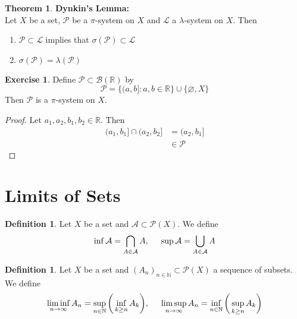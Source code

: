 \documentclass{book}
\theoremstyle{definition}
\newtheorem{defn}[definition]{Definition}
\newtheorem{thm}[definition]{Theorem}
\newtheorem{ex}[definition]{Exercise}
\newcommand{\lam}{\lambda}
\newcommand{\sig}{\sigma}
\newcommand{\N}{\mathbb{N}}
\newcommand{\R}{\mathbb{R}}
\newcommand{\MA}{\mathcal{A}}
\newcommand{\MB}{\mathcal{B}}
\newcommand{\ML}{\mathcal{L}}
\newcommand{\MP}{\mathcal{P}}
\newcommand{\ld}[1]{\label{defn:#1}}
\DeclareMathOperator*{\0}{\mbf{0}}
\DeclareMathOperator*{\1}{\mbf{1}}
\begin{document}
	\begin{thm} \textbf{Dynkin's Lemma:} \\
		Let $X$ be a set, $\MP$ be a $\pi$-system on $X$ and $\ML$ a $\lam$-system on $X$. Then
		\begin{enumerate}
			\item $\MP \subset \ML$ implies that $\sig(\MP) \subset \ML$ 
			\item $\sig(\MP) = \lam(\MP)$
		\end{enumerate} 
	\end{thm}
	
	\begin{ex}
		Define $\MP \subset \MB(\R)$ by $$\MP = \{(a,b]: a,b \in \R\} \cup \{\varnothing, X\}$$
		Then $\MP$ is a $\pi$-system on $X$.
	\end{ex}

	\begin{proof}
		Let $a_1, a_2, b_1, b_2 \in \R$. Then 
		\begin{align*}
			(a_1, b_1] \cap (a_2, b_2] 
			& = (a_2, b_1] \\
			& \in \MP
		\end{align*} 
	\end{proof}


	
		
	
	
	
	
	
	
	
	
	
	
	
	
	
	
	
	
	
	
	
	
	
	
	
	
	
	
	\newpage
	\section{Limits of Sets}
	
	\begin{defn} \ld{00000} 
		Let $X$ be a set and $\MA \subset \MP(X)$. We define $$\inf \MA = \bigcap_{A \in \MA } A ,\hspace{.5cm} \sup \MA = \bigcup_{A \in \MA} A$$
		
	\end{defn}
	
	\begin{defn} \ld{00000} 
		Let $X$ be a set and $(A_n)_{n \in \N} \subset \MP(X)$ a sequence of subsets. We define
		$$\liminf_{n \rightarrow \infty} A_n = \sup_{n \in \N} \bigg( \inf_{k \geq n}A_k \bigg), \hspace{.5cm } \limsup_{n \rightarrow \infty} A_n = \inf_{n \in \N} \bigg(\sup_{k \geq n}A_k \bigg)$$
	\end{defn}
	
\end{document}
